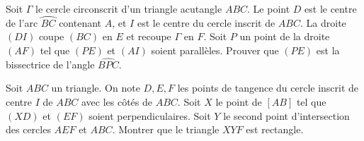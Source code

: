 \begin{exo}{}Soit $ \Gamma$ le cercle circonscrit d'un triangle acutangle $ABC$. Le point $D$ est le centre de l'arc $ \wideparen {BC}$  contenant  $A$, et $I$ est le centre du cercle inscrit de $ABC$. La droite $(DI)$ coupe $(BC)$ en $E$ et recoupe $ \Gamma$ en $F$. Soit $P$ un point de la droite $(AF)$ tel que $(PE)$ et $(AI)$ soient parallèles. Prouver que $(PE)$ est la bissectrice de l'angle $ \widehat {BPC}$.
\end{exo}

\begin{exo}{}Soit $ABC$ un triangle. On note $D,E,F$ les points de tangence du cercle inscrit de centre $I$ de $ABC$ avec les côtés de $ABC$. Soit $X$ le point de $[AB]$ tel que $(XD)$ et $(EF)$ soient perpendiculaires. Soit $Y$ le second point d'intersection des cercles $AEF$ et $ABC$. Montrer que le triangle $XYF$ est rectangle.
\end{exo}